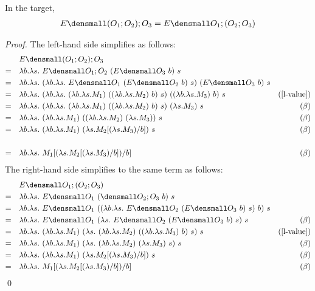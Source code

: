 \begin{lemma}
  \label{thm:ext-compose-assoc}
  In the target,
  \begin{align*}
    E\den{(O_1;O_2);O_3} = E\den{O_1;(O_2;O_3)}
  \end{align*}
\end{lemma}
\begin{proof}
  The left-hand side simplifies as follows:
  \begin{align*}
    &\quad E\den{(O_1;O_2);O_3} \\
    =& \quad \lambda b. \lambda s.~ E\den{O_1;O_2} ~(E\den{O_3} ~b) ~s \\
    =& \quad \lambda b. \lambda s.~ (\lambda b. \lambda s.~ E\den{O_1} ~(E\den{O_2} ~b) ~s) ~(E\den{O_3} ~b) ~s \\
    =& \quad \lambda b. \lambda s.~ (\lambda b. \lambda s.~ (\lambda b. \lambda s. M_1) ~((\lambda b. \lambda s. M_2) ~b) ~s) ~((\lambda b. \lambda s. M_3) ~b) ~s & (\cref{l-value}) \\
    =& \quad \lambda b. \lambda s.~ (\lambda b. \lambda s.~ (\lambda b. \lambda s. M_1) ~((\lambda b. \lambda s. M_2) ~b) ~s) ~(\lambda s. M_3) ~s & (\beta) \\
    =& \quad \lambda b. \lambda s.~ (\lambda b. \lambda s. M_1) ~((\lambda b. \lambda s. M_2) ~(\lambda s. M_3)) ~s & (\beta) \\
    =& \quad \lambda b. \lambda s.~ (\lambda b. \lambda s. M_1) ~(\lambda s. M_2\subst{b}{(\lambda s. M_3)}) ~s & (\beta) \\
    \\
    =& \quad \lambda b. \lambda s.~ M_1\subst{b}{(\lambda s. M_2\subst{b}{(\lambda s. M_3)})} & (\beta) \\
  \end{align*}
  The right-hand side simplifies to the same term as follows:
  \begin{align*}
    &\quad E\den{O_1;(O_2;O_3)} \\
    =& \quad \lambda b. \lambda s.~ E\den{O_1} ~(\den{O_2;O_3} ~b) ~s \\
    =& \quad \lambda b. \lambda s.~ E\den{O_1} ~((\lambda b. \lambda s.~ E\den{O_2} ~(E\den{O_3} ~b) ~s) ~b) ~s \\
    =& \quad \lambda b. \lambda s.~ E\den{O_1} ~(\lambda s.~ E\den{O_2} ~(E\den{O_3} ~b) ~s) ~s & (\beta)\\
    =& \quad \lambda b. \lambda s.~ (\lambda b. \lambda s. M_1) ~(\lambda s.~ (\lambda b. \lambda s. M_2) ~((\lambda b. \lambda s. M_3) ~b) ~s) ~s & (\cref{l-value}) \\
    =& \quad \lambda b. \lambda s.~ (\lambda b. \lambda s. M_1) ~(\lambda s.~ (\lambda b. \lambda s. M_2) ~(\lambda s. M_3) ~s) ~s & (\beta) \\
    =& \quad \lambda b. \lambda s.~ (\lambda b. \lambda s. M_1) ~(\lambda s. M_2\subst{b}{(\lambda s. M_3)}) ~s & (\beta) \\
    =& \quad \lambda b. \lambda s.~ M_1\subst{b}{(\lambda s. M_2\subst{b}{(\lambda s. M_3)})} & (\beta)
  \end{align*}
  \qed
\end{proof}

